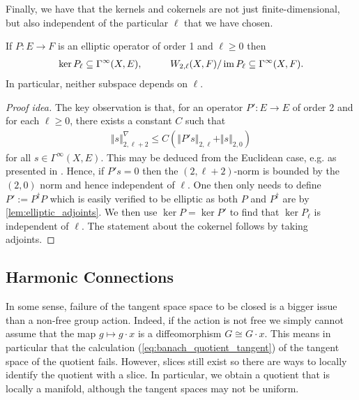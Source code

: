\documentclass[12pt]{ociamthesis}  %
\begin{document}
Finally, we have that the kernels and cokernels are not just
finite-dimensional, but also independent of the particular $\ell$
that we have chosen.

\begin{theorem}\label{eq:independence_of_l}
  If $P:E\to F$ is an elliptic operator of order 1
  and $\ell\geq 0$ then
  \begin{align*}
    \ker P_\ell \subseteq \Gamma^\infty(X,E),\hspace{1cm}
    W_{2,\ell}(X,F)/\operatorname{im} P_\ell \subseteq \Gamma^\infty(X,F).
  \end{align*}
  In particular, neither subspace depends on $\ell$.
  \begin{proof}[Proof idea]
    The key observation is that, for an operator
    $P':E\to E$ of order 2 and for each $\ell\geq 0$,
    there exists a constant $C$ such that
    \begin{align*}
      \Vert s\Vert^\nabla_{2,\ell+2} \leq C(\Vert P's\Vert_{2,\ell} + \Vert s\Vert_{2,0})
    \end{align*}
    for all $s\in\Gamma^\infty(X,E)$.
    This may be deduced from the Euclidean case, e.g. as presented in
    \cite[6.3.1 Theorem 2]{evans1998}. Hence, if $P's = 0$ then the
    $(2,\ell+2)$-norm is bounded
    by the $(2,0)$ norm and hence independent of $\ell$.
    One then only needs to define $P' := P^\dagger P$ which is easily
    verified to be elliptic as both $P$ and $P^\dagger$ are by
    \ref{lem:elliptic_adjoints}. We then use $\ker P = \ker P'$
    to find that $\ker P_\ell$ is independent of $\ell$. The
    statement about the cokernel follows by taking adjoints.
  \end{proof}
\end{theorem}

\subsection{Harmonic Connections}

In some sense, failure of the tangent space space to be closed is a bigger issue
than a non-free group action. Indeed, if the action is not free we simply cannot
assume that the map $g\mapsto g\cdot x$ is a diffeomorphism $G\cong G\cdot x$.
This means in particular that the calculation (\ref{eq:banach_quotient_tangent})
of the tangent space of the quotient fails. However, slices still exist so there
are ways to locally identify the quotient with a slice. In particular, we obtain
a quotient that is locally a manifold, although the tangent spaces may not be
uniform.
\end{document}
